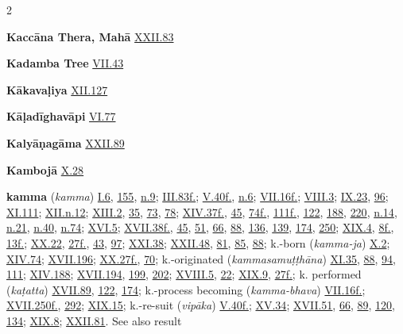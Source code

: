 \begin{multicols}{2}
\begin{vismHanging}
\par\textbf{Kaccāna Thera, Mahā} \hyperlink{XXII.83}{XXII.83}{}
\par\textbf{Kadamba Tree} \hyperlink{VII.43}{VII.43}{}
\par\textbf{Kākavaḷiya} \hyperlink{XII.127}{XII.127}{}
\par\textbf{Kāḷadīghavāpi} \hyperlink{VI.77}{VI.77}{}
\par\textbf{Kalyāṇagāma} \hyperlink{XXII.89}{XXII.89}{}
\par\textbf{Kambojā} \hyperlink{X.28}{X.28}{}
\par\textbf{kamma} (\emph{kamma}) \hyperlink{I.6}{I.6}{}, \hyperlink{I.155}{155}{}, \hyperlink{I.n9}{n.9}{}; \hyperlink{III.83}{III.83f.}{}; \hyperlink{V.40}{V.40f.}{}, \hyperlink{V.n6}{n.6}{}; \hyperlink{VII.16}{VII.16f.}{}; \hyperlink{VIII.3}{VIII.3}{}; \hyperlink{IX.23}{IX.23}{}, \hyperlink{IX.96}{96}{}; \hyperlink{XI.111}{XI.111}{}; \hyperlink{XII.n12}{XII.n.12}{}; \hyperlink{XIII.2}{XIII.2}{}, \hyperlink{XIII.35}{35}{}, \hyperlink{XIII.73}{73}{}, \hyperlink{XIII.78}{78}{}; \hyperlink{XIV.37}{XIV.37f.}{}, \hyperlink{XIV.45}{45}{}, \hyperlink{XIV.74}{74f.}{}, \hyperlink{XIV.111}{111f.}{}, \hyperlink{XIV.122}{122}{}, \hyperlink{XIV.188}{188}{}, \hyperlink{XIV.220}{220}{}, \hyperlink{XIV.n14}{n.14}{}, \hyperlink{XIV.n21}{n.21}{}, \hyperlink{XIV.n40}{n.40}{}, \hyperlink{XIV.n74}{n.74}{}; \hyperlink{XVI.5}{XVI.5}{}; \hyperlink{XVII.38}{XVII.38f.}{}, \hyperlink{XVII.45}{45}{}, \hyperlink{XVII.51}{51}{}, \hyperlink{XVII.66}{66}{}, \hyperlink{XVII.88}{88}{}, \hyperlink{XVII.136}{136}{}, \hyperlink{XVII.139}{139}{}, \hyperlink{XVII.174}{174}{}, \hyperlink{XVII.250}{250}{}; \hyperlink{XIX.4}{XIX.4}{}, \hyperlink{XIX.8}{8f.}{}, \hyperlink{XIX.13}{13f.}{}; \hyperlink{XX.22}{XX.22}{}, \hyperlink{XX.27}{27f.}{}, \hyperlink{XX.43}{43}{}, \hyperlink{XX.97}{97}{}; \hyperlink{XXI.38}{XXI.38}{}; \hyperlink{XXII.48}{XXII.48}{}, \hyperlink{XXII.81}{81}{}, \hyperlink{XXII.85}{85}{}, \hyperlink{XXII.88}{88}{}; k.-born (\emph{kamma-ja}) \hyperlink{X.2}{X.2}{}; \hyperlink{XIV.74}{XIV.74}{}; \hyperlink{XVII.196}{XVII.196}{}; \hyperlink{XX.27}{XX.27f.}{}, \hyperlink{XX.70}{70}{}; k.-originated (\emph{kammasamuṭṭhāna}) \hyperlink{XI.35}{XI.35}{}, \hyperlink{XI.88}{88}{}, \hyperlink{XI.94}{94}{}, \hyperlink{XI.111}{111}{}; \hyperlink{XIV.188}{XIV.188}{}; \hyperlink{XVII.194}{XVII.194}{}, \hyperlink{XVII.199}{199}{}, \hyperlink{XVII.202}{202}{}; \hyperlink{XVIII.5}{XVIII.5}{}, \hyperlink{XVIII.22}{22}{}; \hyperlink{XIX.9}{XIX.9}{}, \hyperlink{XIX.27}{27f.}{}; k. performed (\emph{kaṭatta}) \hyperlink{XVII.89}{XVII.89}{}, \hyperlink{XVII.122}{122}{}, \hyperlink{XVII.174}{174}{}; k.-process becoming (\emph{kamma-bhava}) \hyperlink{VII.16}{VII.16f.}{}; \hyperlink{XVII.250}{XVII.250f.}{}, \hyperlink{XVII.292}{292}{}; \hyperlink{XIX.15}{XIX.15}{}; k.-re-suit (\emph{vipāka}) \hyperlink{V.40}{V.40f.}{}; \hyperlink{XV.34}{XV.34}{}; \hyperlink{XVII.51}{XVII.51}{}, \hyperlink{XVII.66}{66}{}, \hyperlink{XVII.89}{89}{}, \hyperlink{XVII.120}{120}{}, \hyperlink{XVII.134}{134}{}; \hyperlink{XIX.8}{XIX.8}{}; \hyperlink{XXII.81}{XXII.81}{}. See also result 

\end{vismHanging}
\end{multicols}
